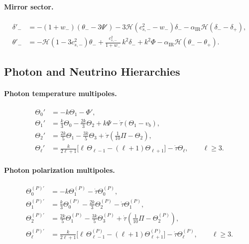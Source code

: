 \documentclass[11pt,a4paper]{article}
\begin{document}
\paragraph{Mirror sector.}
\begin{align}
    \delta'_{-}
    &= - (1+w_{-})(\theta_{-} - 3\Psi')
       - 3\mathcal{H}(c_{s,-}^{2} - w_{-})\delta_{-}
       - \alpha_{\mathrm{IR}}\mathcal{H}(\delta_{-} - \delta_{+}), \\
    \theta'_{-}
    &= - \mathcal{H}(1 - 3c_{s,-}^{2})\theta_{-}
       + \frac{c_{s,-}^{2}}{1+w_{-}}\,k^{2}\delta_{-}
       + k^{2}\Phi
       - \alpha_{\mathrm{IR}}\mathcal{H}(\theta_{-} - \theta_{+}).
\end{align}

\subsection{Photon and Neutrino Hierarchies}

\paragraph{Photon temperature multipoles.}
\begin{align}
    \Theta_{0}' &= -k\Theta_{1} - \Phi', \\
    \Theta_{1}' &= \frac{k}{3}\Theta_{0} - \frac{2k}{3}\Theta_{2}
                  + k\Psi - \dot{\tau}(\Theta_{1} - v_{b}), \\
    \Theta_{2}' &= \frac{2k}{5}\Theta_{1} - \frac{3k}{5}\Theta_{3}
                  + \dot{\tau}\left(\frac{1}{10}\Pi - \Theta_{2}\right), \\
    \Theta_{\ell}' &= \frac{k}{2\ell+1}\bigl[\ell\,\Theta_{\ell-1}
                     - (\ell+1)\Theta_{\ell+1}\bigr]
                     - \dot{\tau}\Theta_{\ell}, \qquad \ell \ge 3.
\end{align}

\paragraph{Photon polarization multipoles.}
\begin{align}
    \Theta_{0}^{(P)\prime} &= -k\Theta_{1}^{(P)} - \dot{\tau}\Theta_{0}^{(P)}, \\
    \Theta_{1}^{(P)\prime} &= \frac{k}{3}\Theta_{0}^{(P)}
                             - \frac{2k}{3}\Theta_{2}^{(P)}
                             - \dot{\tau}\Theta_{1}^{(P)}, \\
    \Theta_{2}^{(P)\prime} &= \frac{2k}{5}\Theta_{1}^{(P)}
                             - \frac{3k}{5}\Theta_{3}^{(P)}
                             + \dot{\tau}\left(\frac{1}{10}\Pi
                             - \Theta_{2}^{(P)}\right), \\
    \Theta_{\ell}^{(P)\prime} &=
    \frac{k}{2\ell+1}\bigl[\ell\,\Theta_{\ell-1}^{(P)}
    - (\ell+1)\Theta_{\ell+1}^{(P)}\bigr]
    - \dot{\tau}\Theta_{\ell}^{(P)}, \qquad \ell \ge 3.
\end{align}
\end{document}
